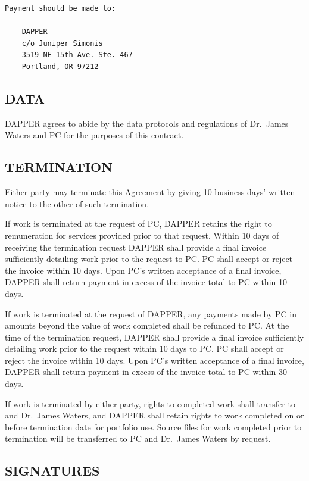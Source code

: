 \documentclass[
  11pt,
]{article}
\begin{document}
\begin{verbatim}
Payment should be made to:

    DAPPER
    c/o Juniper Simonis
    3519 NE 15th Ave. Ste. 467
    Portland, OR 97212
\end{verbatim}

\hypertarget{data}{%
\subsection{DATA}\label{data}}

DAPPER agrees to abide by the data protocols and regulations of
Dr.~James Waters and PC for the purposes of this contract.

\hypertarget{termination}{%
\subsection{TERMINATION}\label{termination}}

Either party may terminate this Agreement by giving 10 business days'
written notice to the other of such termination.

If work is terminated at the request of PC, DAPPER retains the right to
remuneration for services provided prior to that request. Within 10 days
of receiving the termination request DAPPER shall provide a final
invoice sufficiently detailing work prior to the request to PC. PC shall
accept or reject the invoice within 10 days. Upon PC's written
acceptance of a final invoice, DAPPER shall return payment in excess of
the invoice total to PC within 10 days.

If work is terminated at the request of DAPPER, any payments made by PC
in amounts beyond the value of work completed shall be refunded to PC.
At the time of the termination request, DAPPER shall provide a final
invoice sufficiently detailing work prior to the request within 10 days
to PC. PC shall accept or reject the invoice within 10 days. Upon PC's
written acceptance of a final invoice, DAPPER shall return payment in
excess of the invoice total to PC within 30 days.

If work is terminated by either party, rights to completed work shall
transfer to and Dr.~James Waters, and DAPPER shall retain rights to work
completed on or before termination date for portfolio use. Source files
for work completed prior to termination will be transferred to PC and
Dr.~James Waters by request.

\hypertarget{signatures}{%
\subsection{SIGNATURES}\label{signatures}}
\end{document}
